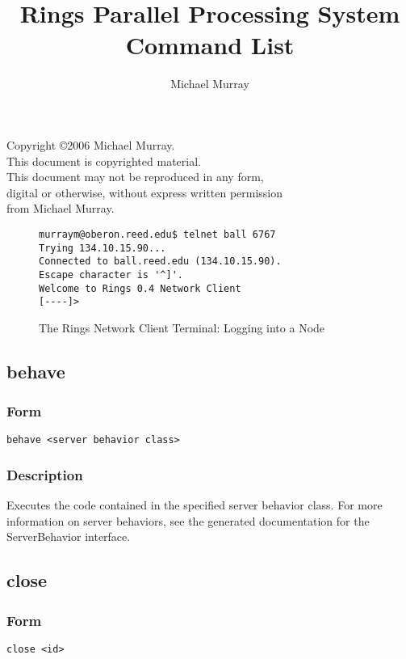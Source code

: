 \documentclass[12pt]{article}
\title{Rings Parallel Processing System Command List}
\author{Michael Murray}
\begin{document}
\maketitle
\frontmatter
\begin{center}
\small
Copyright \copyright  2006 Michael Murray. \\
This document is copyrighted material. \\
This document may not be reproduced in any form, \\
digital or otherwise, without express written permission \\
from Michael Murray.
\end{center}

\begin{figure}
\begin{verbatim}
murraym@oberon.reed.edu$ telnet ball 6767
Trying 134.10.15.90...
Connected to ball.reed.edu (134.10.15.90).
Escape character is '^]'.
Welcome to Rings 0.4 Network Client
[----]> 
\end{verbatim}
\caption{The Rings Network Client Terminal: Logging into a Node}
\end{figure}

\subsection{behave}
\subsubsection{Form}
\begin{verbatim}
behave <server behavior class>
\end{verbatim}
\subsubsection{Description}
Executes the code contained in the specified server behavior class. For more information on server behaviors, see the generated documentation for the ServerBehavior interface.

\subsection{close}
\subsubsection{Form}
\begin{verbatim}
close <id>
\end{verbatim}
\end{document}
